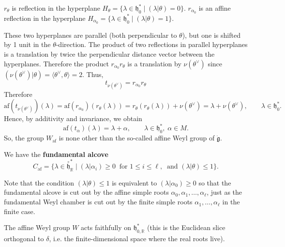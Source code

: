\documentclass[12pt]{article}
\begin{document}
$r_\theta$ is reflection in the hyperplane $H_\theta = \{\lambda \in \mathfrak{h}_0^* \mid (\lambda|\theta)=0\}$. $r_{\alpha_0}$ is an affine reflection in the hyperplane $H_{\alpha_0} = \{\lambda \in \mathfrak{h}_0^* \mid (\lambda|\theta)=1\}$.

These two hyperplanes are parallel (both perpendicular to $ \theta $), but one is shifted by 1 unit in the $\theta$-direction. The product of two reflections in parallel hyperplanes is a translation by twice the perpendicular distance vector between the hyperplanes. Therefore the product $r_{\alpha_0} r_\theta$ is a translation by $\nu(\theta^\vee)$ since $(\nu(\theta^\vee)|\theta) = \langle \theta^\vee, \theta \rangle = 2$. Thus,
\[t_{\nu(\theta^\vee)} = r_{\alpha_0} r_\theta\]
Therefore
\[
    \mathrm{af}(t_{\nu(\theta^\vee)})(\lambda) 
    = \mathrm{af}(r_{\alpha_0})(r_\theta(\lambda)) = r_\theta(r_\theta(\lambda)) + \nu(\theta^\vee)
    = \lambda + \nu(\theta^\vee), \qquad \lambda \in \mathfrak{h}^*_0.
\]
Hence, by additivity and invariance, we obtain
\begin{equation} \label{6.6.3}
    \mathrm{af}(t_\alpha)(\lambda) = \lambda + \alpha, 
    \qquad \lambda \in \mathfrak{h}^*_0, \; \alpha \in M.
\end{equation}
So, the group $W_{\mathrm{af}}$ is none other than the so-called affine Weyl group of $\dot{\mathfrak{g}}$.

\begin{definition}
We have the \textbf{fundamental alcove}
\[
C_{\mathrm{af}} = \{ \lambda \in \overset{\circ}{\mathfrak{h}}^*_{\mathbb{R}} \mid 
(\lambda|\alpha_i) \geq 0 \;\; \text{for } 1 \leq i \leq \ell,\;\; 
\text{and } (\lambda|\theta) \leq 1 \}.
\]
\end{definition}
Note that the condition $(\lambda | \theta ) \leq 1$ is equivalent to $(\lambda | \alpha_0) \geq 0$ so that the fundamental alcove is cut out by the affine simple roots $\alpha_0, \alpha_1, \ldots, \alpha_\ell$, just as the fundamental Weyl chamber is cut out by the finite simple roots $\alpha_1, \ldots, \alpha_\ell$ in the finite case.

The affine Weyl group $W$ acts faithfully on $\mathfrak{h}^*_{0,\mathbb{R}}$ (this is the Euclidean slice orthogonal to $\delta$, i.e. the finite-dimensional space where the real roots live).
\end{document}
